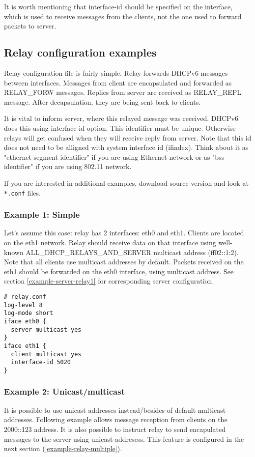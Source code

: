 \vspace{0.5cm}

It is worth mentioning that interface-id should be specified on the
interface, which is used to receive messages from the clients, not the
one used to forward packets to server.

\subsection{Relay configuration examples}
\label{example-relay}

Relay configuration file is fairly simple. Relay forwards DHCPv6
messages between interfaces. Messages from client are encapsulated and
forwarded as RELAY\_FORW messages. Replies from server are received as
RELAY\_REPL message. After decapsulation, they are being sent back to
clients. 

It is vital to inform server, where this relayed message was
received. DHCPv6 does this using interface-id option. This identifier
must be unique. Otherwise relays will get confused when they will
receive reply from server. Note that this id does not need to be
alligned with system interface id (ifindex). Think about it as
"ethernet segment identifier" if you are using Ethernet network or as
"bss identifier" if you are using 802.11 network.

If you are interested in additional examples, download source version
and look at \verb+*.conf+ files.

\subsubsection{Example 1: Simple}
\label{example-relay-1}
Let's assume this case: relay has 2 interfaces: eth0 and
eth1. Clients are located on the eth1 network. Relay should receive
data on that interface using well-known ALL\_DHCP\_RELAYS\_AND\_SERVER
multicast address (ff02::1:2). Note that all clients use multicast
addresses by default. Packets received on the eth1 should be
forwarded on the eth0 interface, using multicast address. See section
\ref{example-server-relay1} for corresponding server configuration.

\begin{lstlisting}
# relay.conf
log-level 8
log-mode short
iface eth0 {
  server multicast yes
}
iface eth1 {
  client multicast yes
  interface-id 5020
}
\end{lstlisting}

\subsubsection{Example 2: Unicast/multicast}
It is possible to use unicast addresses instead/besides of default
multicast addresses. Following example allows message reception from
clients on the 2000::123 address. It is also possible to instruct
relay to send encapulated messages to the server using unicast
addresess. This feature is configured in the next section
(\ref{example-relay-multiple}). 

